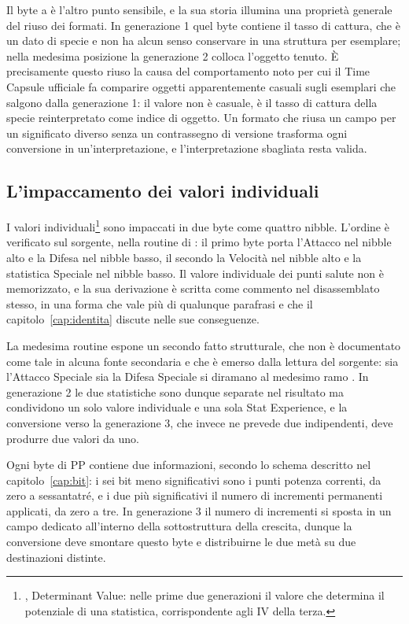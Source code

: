 Il byte a  è l'altro punto sensibile, e la sua storia illumina una proprietà generale del riuso dei formati. In generazione 1 quel byte contiene il tasso di cattura, che è un dato di specie e non ha alcun senso conservare in una struttura per esemplare; nella medesima posizione la generazione 2 colloca l'oggetto tenuto. È precisamente questo riuso la causa del comportamento noto per cui il Time Capsule ufficiale fa comparire oggetti apparentemente casuali sugli esemplari che salgono dalla generazione 1: il valore non è casuale, è il tasso di cattura della specie reinterpretato come indice di oggetto. Un formato che riusa un campo per un significato diverso senza un contrassegno di versione trasforma ogni conversione in un'interpretazione, e l'interpretazione sbagliata resta valida.

\subsection{L'impaccamento dei valori individuali}

I valori individuali\footnote{, Determinant Value: nelle prime due generazioni il valore che determina il potenziale di una statistica, corrispondente agli IV della terza.} sono impaccati in due byte come quattro nibble. L'ordine è verificato sul sorgente, nella routine  di  \cite{pokecrystal}: il primo byte porta l'Attacco nel nibble alto e la Difesa nel nibble basso, il secondo la Velocità nel nibble alto e la statistica Speciale nel nibble basso. Il valore individuale dei punti salute non è memorizzato, e la sua derivazione è scritta come commento nel disassemblato stesso, in una forma che vale più di qualunque parafrasi e che il capitolo~\ref{cap:identita} discute nelle sue conseguenze.

La medesima routine espone un secondo fatto strutturale, che non è documentato come tale in alcuna fonte secondaria e che è emerso dalla lettura del sorgente: sia l'Attacco Speciale sia la Difesa Speciale si diramano al medesimo ramo . In generazione 2 le due statistiche sono dunque separate nel risultato ma condividono un solo valore individuale e una sola Stat Experience, e la conversione verso la generazione 3, che invece ne prevede due indipendenti, deve produrre due valori da uno.

Ogni byte di PP contiene due informazioni, secondo lo schema descritto nel capitolo~\ref{cap:bit}: i sei bit meno significativi sono i punti potenza correnti, da zero a sessantatré, e i due più significativi il numero di incrementi permanenti applicati, da zero a tre. In generazione 3 il numero di incrementi si sposta in un campo dedicato all'interno della sottostruttura della crescita, dunque la conversione deve smontare questo byte e distribuirne le due metà su due destinazioni distinte.

